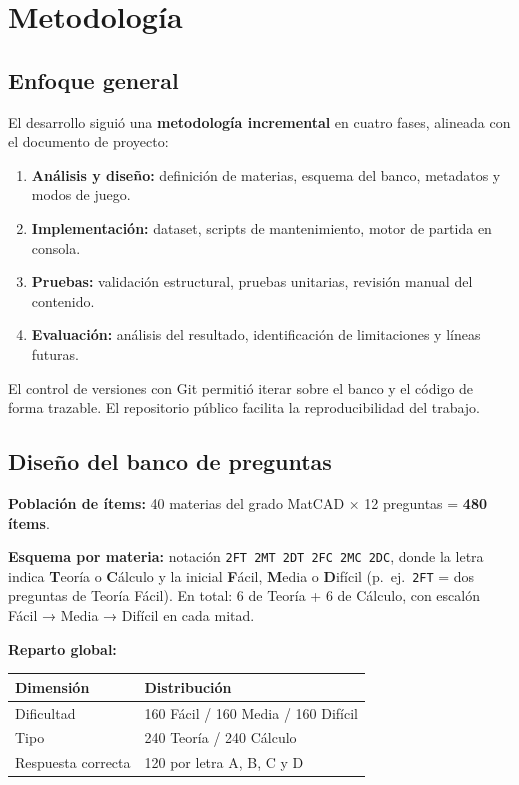 \documentclass[11pt,a4paper]{article}
\newcommand{\bloquetfg}[1]{\par\smallskip\noindent #1\par}
\newcommand{\iniciotabla}{\par\medskip\renewcommand{\arraystretch}{1.12}}
\newcommand{\fintabla}{\par\medskip}
\begin{document}
\section{Metodología}

\subsection{Enfoque general}

El desarrollo siguió una \textbf{metodología incremental} en cuatro fases, alineada con el documento de proyecto:
\begin{enumerate}
  \item \textbf{Análisis y diseño:} definición de materias, esquema del banco, metadatos y modos de juego.
  \item \textbf{Implementación:} dataset, scripts de mantenimiento, motor de partida en consola.
  \item \textbf{Pruebas:} validación estructural, pruebas unitarias, revisión manual del contenido.
  \item \textbf{Evaluación:} análisis del resultado, identificación de limitaciones y líneas futuras.
\end{enumerate}

El control de versiones con Git permitió iterar sobre el banco y el código de forma trazable. El repositorio público facilita la reproducibilidad del trabajo.

\subsection{Diseño del banco de preguntas}

\bloquetfg{\textbf{Población de ítems:} 40 materias del grado MatCAD × 12 preguntas = \textbf{480 ítems}.}

\bloquetfg{\textbf{Esquema por materia:} notación \texttt{2FT 2MT 2DT 2FC 2MC 2DC}, donde la letra indica \textbf{T}eoría o \textbf{C}álculo y la inicial \textbf{F}ácil, \textbf{M}edia o \textbf{D}ifícil (p.\ ej.\ \texttt{2FT} = dos preguntas de Teoría Fácil). En total: 6 de Teoría + 6 de Cálculo, con escalón Fácil → Media → Difícil en cada mitad.}

\bloquetfg{\textbf{Reparto global:}}
\iniciotabla
\begin{tabular}{@{}ll@{}}
\toprule
\textbf{Dimensión} & \textbf{Distribución} \\
\midrule
Dificultad & 160 Fácil / 160 Media / 160 Difícil \\
Tipo & 240 Teoría / 240 Cálculo \\
Respuesta correcta & 120 por letra A, B, C y D \\
\bottomrule
\end{tabular}
\fintabla
\end{document}
